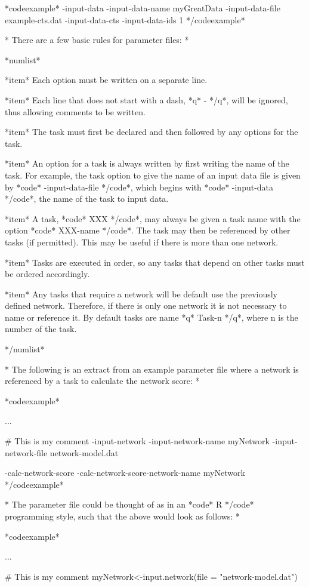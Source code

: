 *codeexample* -input-data -input-data-name myGreatData -input-data-file example-cts.dat -input-data-cts -input-data-ids 1 */codeexample*

* There are a few basic rules for parameter files: *

*numlist*

*item* Each option must be written on a separate line.

*item* Each line that does not start with a dash, *q* - */q*, will be ignored, thus allowing comments to be written.

*item* The task must first be declared and then followed by any options for the task.

*item* An option for a task is always written by first writing the name of the task. For example, the task option to give the name of an input data file is given by *code* -input-data-file */code*, which begins with *code* -input-data */code*, the name of the task to input data.

*item* A task, *code* XXX */code*, may always be given a task name with the option *code* XXX-name */code*. The task may then be referenced by other tasks (if permitted). This may be useful if there is more than one network.

*item* Tasks are executed in order, so any tasks that depend on other tasks must be ordered accordingly.

*item* Any tasks that require a network will be default use the previously defined network. Therefore, if there is only one network it is not necessary to name or reference it. By default tasks are name *q* Task-n */q*, where n is the number of the task.

*/numlist*

* The following is an extract from an example parameter file where a network is referenced by a task to calculate the network score: *

*codeexample*

...

# This is my comment -input-network -input-network-name myNetwork -input-network-file network-model.dat

-calc-network-score -calc-network-score-network-name myNetwork */codeexample*

* The parameter file could be thought of as in an *code* R */code* programming style, such that the above would look as follows: *

*codeexample*

...

# This is my comment myNetwork<-input.network(file = "network-model.dat")

